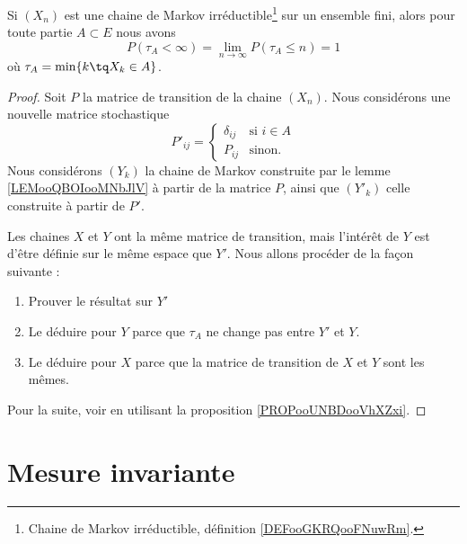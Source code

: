 \begin{proposition}     \label{PROPooCAORooMEaxtq}
	Si \( (X_n)\) est une chaine de Markov irréductible\footnote{Chaine de Markov irréductible, définition \ref{DEFooGKRQooFNuwRm}.} sur un ensemble fini, alors pour toute partie \( A\subset E\) nous avons
	\begin{equation}
		P(\tau_A<\infty)=\lim_{n\to \infty} P(\tau_A\leq n)=1
	\end{equation}
	où \( \tau_A=\min\{ k\tq X_k\in A \}\).
\end{proposition}

\begin{proof}
	Soit \( P\) la matrice de transition de la chaine \( (X_n)\). Nous considérons une nouvelle matrice stochastique
	\begin{equation}
		P'_{ij}=\begin{cases}
			\delta_{ij} & \text{si } i\in A \\
			P_{ij}      & \text{sinon. }
		\end{cases}
	\end{equation}
	Nous considérons \( (Y_k)\) la chaine de Markov construite par le lemme \ref{LEMooQBOIooMNbJlV} à partir de la matrice \( P\), ainsi que \( (Y'_k)\) celle construite à partir de \( P'\).

	Les chaines \( X\) et \( Y\) ont la même matrice de transition, mais l'intérêt de \( Y\) est d'être définie sur le même espace que \( Y'\). Nous allons procéder de la façon suivante :
	\begin{enumerate}
		\item
		      Prouver le résultat sur \( Y'\)
		\item
		      Le déduire pour \( Y\) parce que \( \tau_A\) ne change pas entre \( Y'\) et \( Y\).
		\item
		      Le déduire pour \( X\) parce que la matrice de transition de \( X\) et \( Y\) sont les mêmes.
	\end{enumerate}

	Pour la suite, voir \cite{GMbugcT} en utilisant la proposition \ref{PROPooUNBDooVhXZxi}.
\end{proof}

\section{Mesure invariante}

